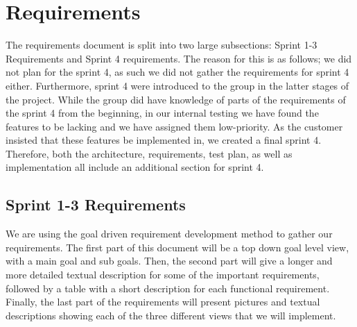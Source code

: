 \documentclass[../document]{subfiles}
\begin{document}
\section{Requirements}
\label{requirements}

The requirements document is split into two large subsections: Sprint 1-3 Requirements and Sprint 4 requirements. The reason for this is as follows; we did not plan for the sprint 4, as such we did not gather the requirements for sprint 4 either. Furthermore, sprint 4 were introduced to the group in the latter stages of the project. While the group did have knowledge of parts of the requirements of the sprint 4 from the beginning, in our internal testing we have found the features to be lacking and we have assigned them low-priority. As the customer insisted that these features be implemented in, we created a final sprint 4. Therefore, both the architecture, requirements, test plan, as well as implementation all include an additional section for sprint 4.

\subsection{Sprint 1-3 Requirements}

We are using the goal driven requirement development method to gather our requirements. The first part of this document will be a top down goal level view, with a main goal and sub goals. Then, the second part will give a longer and more detailed textual description for some of the important requirements, followed by a table with a short description for each functional requirement. Finally, the last part of the requirements will present pictures and textual descriptions showing each of the three different views that we will implement.

\newpage
\end{document}
